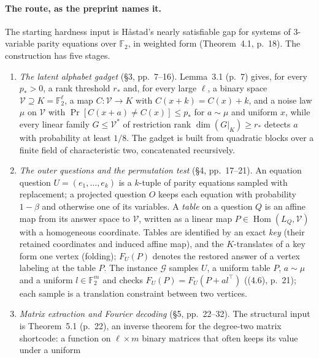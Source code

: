 \documentclass[11pt]{article}
\newcommand{\ploc}[2]{#1}
\begin{document}
\paragraph{The route, as the preprint names it.}
The starting hardness input is H\aa stad's nearly satisfiable gap for systems of
3-variable parity equations over $\mathbb F_2$, in weighted form
(\ploc{Theorem~4.1, p.~18}{03-game.tex:25--37}). The construction has five
stages.
\begin{enumerate}
\item \emph{The latent alphabet gadget} (\ploc{\S3, pp.~7--16}{02-latent.tex:1--760}).
  \ploc{Lemma~3.1 (p.~7)}{02-latent.tex:8--31} gives, for every $p_*>0$, a rank
  threshold $r_*$ and, for every large $\ell$, a binary space $\mathcal V\supseteq
  K=\mathbb F_2^{\ell}$, a map $C:\mathcal V\to K$ with $C(x+k)=C(x)+k$, and a noise law
  $\mu$ on $\mathcal V$ with $\Pr[C(x+a)\ne C(x)]\le p_*$ for $a\sim\mu$ and
  uniform $x$, while every linear family $G\le\mathcal V^*$ of restriction rank
  $\dim(G|_K)\ge r_*$ detects $a$ with probability at least $1/8$. The gadget is
  built from quadratic blocks over a finite field of characteristic two,
  concatenated recursively.
\item \emph{The outer questions and the permutation test}
  (\ploc{\S4, pp.~17--21}{03-game.tex:1--361}). An equation question
  $U=(e_1,\dots,e_k)$ is a $k$-tuple of parity equations sampled with
  replacement; a projected question $O$ keeps each equation with probability
  $1-\beta$ and otherwise one of its variables. A \emph{table} on a question $Q$
  is an affine map from its answer space to $\mathcal V$, written as a linear map
  $P\in\operatorname{Hom}(L_Q,\mathcal V)$ with a homogeneous coordinate. Tables are identified
  by an exact \emph{key} (their retained coordinates and induced affine map),
  and the $K$-translates of a key form one vertex (folding); $F_U(P)$ denotes the
  restored answer of a vertex labeling at the table $P$. The instance
  $\mathcal G$ samples $U$, a uniform table $P$, $a\sim\mu$ and a uniform
  $l\in\mathbb F_2^{m}$ and checks $F_U(P)=F_U(P+al^{\top})$
  (\ploc{(4.6), p.~21}{03-game.tex:302--305}); each sample is a translation
  constraint between two vertices.
\item \emph{Matrix extraction and Fourier decoding} (\ploc{\S5, pp.~22--32}{04-matrix.tex:1--767}).
  The structural input is \ploc{Theorem~5.1 (p.~22)}{04-matrix.tex:33--60}, an
  inverse theorem for the degree-two matrix shortcode: a function on
  $\ell\times m$ binary matrices that often keeps its value under a uniform

\end{enumerate}
\end{document}
